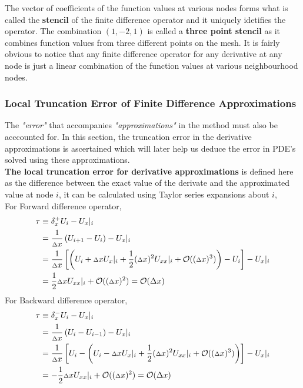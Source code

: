 The vector of coefficients of the function values at various nodes forms what is called the \textbf{stencil} of the finite difference operator and it uniquely idetifies the operator. The combination $(1,-2,1)$ is called a \textbf{three point stencil} as it combines function values from three different points on the mesh.
It is fairly obvious to notice that any finite difference operator for any derivative at any node is just a linear combination of the function values at various neighbourhood nodes.   

\subsubsection{Local Truncation Error of Finite Difference Approximations}
The \textit{"error"} that accompanies \textit{"approximations"} in the method must also be acccounted for. In this section, the truncation error in the derivative approximations is ascertained which will later help us deduce the error in PDE's solved using these approximations.
\\[2mm]
\textbf{The local truncation error for derivative approximations} is defined here as the difference between the exact value of the derivate and the approximated value at node $i$, it can be calculated using Taylor series expansions about $i$,\\[2mm]
For Forward difference operator,\autocite{mitocw}\autocite{thomas2013numerical}
\begin{align*}
    \tau &\equiv \delta _ x^{+} U_ i - {U_ x}|_ i \\
    &= \frac{1}{{\scriptstyle \Delta} x}\left( U_ {i+1} - U_{i}\right) - {U_ x}|_i \\
    &= \frac{1}{{\scriptstyle \Delta} x}\left[ \left( U_ i + {\scriptstyle \Delta} x{U_ x}|_ i + \frac{1}{2}({\scriptstyle \Delta} x)^2{U_{xx}}|_ i + \mathcal{O}(({\scriptstyle \Delta} x)^3)\right) - U_i \right] - {U_ x}|_ i \\
    &= \frac{1}{2}{\scriptstyle \Delta} x{U_{xx}}|_ i + \mathcal{O}(({\scriptstyle \Delta} x)^2) = \mathcal{O}(\Delta x)
\end{align*}
For Backward difference operator, 
\begin{align*}
    \tau &\equiv \delta _ x^{-} U_ i - {U_ x}|_ i \\
    &= \frac{1}{{\scriptstyle \Delta} x}\left( U_ i - U_{i-1}\right) - {U_ x}|_i \\
    &= \frac{1}{{\scriptstyle \Delta} x}\left[ U_ i - \left( U_ i - {\scriptstyle \Delta} x{U_ x}|_ i + \frac{1}{2}({\scriptstyle \Delta} x)^2{U_{xx}}|_ i + \mathcal{O}(({\scriptstyle \Delta} x)^3)\right)\right] - {U_ x}|_ i \\
    &= -\frac{1}{2}{\scriptstyle \Delta} x{U_{xx}}|_ i + \mathcal{O}(({\scriptstyle \Delta} x)^2) = \mathcal{O}(\Delta x)  
\end{align*}
